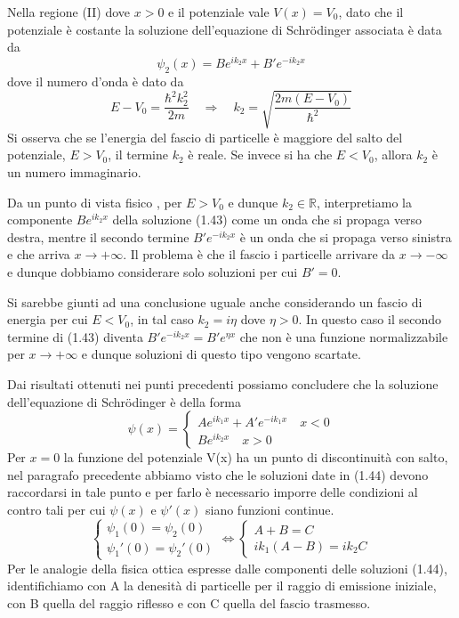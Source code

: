 \noindent Nella regione (II) dove $x > 0 $ e il potenziale vale $V(x) = V_0$, dato che il potenziale \`e costante la soluzione dell'equazione di Schr\"odinger associata \`e data da 
\begin{equation}
	\psi_2(x) = Be^{ik_2x}+B'e^{-ik_2x}
\end{equation}
dove il numero d'onda \`e dato da 
\begin{equation*}
	E-V_0 = \frac{\hbar^2k_2^2}{2m} \quad \Rightarrow \quad  k_2 = \sqrt{\frac{2m(E-V_0)}{\hbar^2}}
\end{equation*}
Si osserva che se l'energia del fascio di particelle \`e maggiore del salto del potenziale, $E > V_0$, il termine $k_2$ \`e reale. Se invece si ha che $E < V_0$, allora $k_2$ \`e un numero immaginario. 

\noindent Da un punto di vista fisico , per $E > V_0$ e dunque $k_2 \in \mathbb{R}$, interpretiamo la componente $Be^{ik_2x}$ della soluzione (1.43) come un onda che si propaga verso destra, mentre il secondo termine $B'e^{-ik_2x}$ \`e un onda che si propaga verso sinistra e che arriva $x \to + \infty$. Il problema \`e che il fascio i particelle arrivare da $x \to - \infty$ e dunque dobbiamo considerare solo soluzioni per cui $B' = 0$.

\noindent Si sarebbe giunti ad una conclusione uguale anche considerando un fascio di energia per cui $E < V_0$, in tal caso $k_2 = i\eta$ dove $\eta > 0$. In questo caso il secondo termine di (1.43) diventa $B'e^{-ik_2x} = B'e^{\eta x}$  che non \`e una funzione normalizzabile per $x \to + \infty$ e dunque soluzioni di questo tipo vengono scartate.
\newline

\noindent Dai risultati ottenuti nei punti precedenti possiamo concludere che la soluzione dell'equazione di Schr\"odinger \`e della forma
\begin{equation}
\psi(x) = \begin{cases}
	Ae^{ik_1x} +A'e^{-ik_1x} \quad x < 0 \\
	Be^{ik_2x} \quad x>0
\end{cases}	
\end{equation}
Per $x = 0 $ la funzione del potenziale V(x) ha un punto di discontinuit\`a con salto, nel paragrafo precedente abbiamo visto che le soluzioni date in (1.44) devono raccordarsi in tale punto e per farlo \`e necessario imporre delle condizioni al contro tali per cui $\psi(x)$ e $\psi'(x)$ siano funzioni continue.
\begin{equation}
	\left \{\begin{array}{l}
		\psi_1(0) = \psi_2(0) \\
		\psi_1'(0) = \psi_2'(0) 
	\end{array} \right.
	\iff
	\left \{ \begin{array}{l}
		A+B = C \\
		ik_1(A-B) = ik_2C
	\end{array}\right.
\end{equation}
Per le analogie della fisica ottica espresse dalle componenti delle soluzioni (1.44), identifichiamo con A la denesit\`a di particelle per il raggio di emissione iniziale, con B quella del raggio riflesso e con C quella del fascio trasmesso. 

